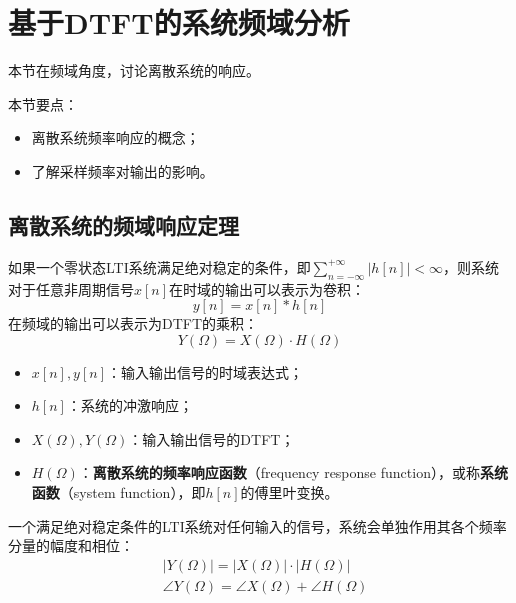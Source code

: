 \section{基于DTFT的系统频域分析}

本节在频域角度，讨论离散系统的响应。

本节要点：
\begin{itemize}
    \item 离散系统频率响应的概念；
    \item 了解采样频率对输出的影响。
\end{itemize}

\subsection{离散系统的频域响应定理}

\begin{theorem}[离散系统的频域响应定理]
如果一个零状态LTI系统满足绝对稳定的条件，即$\sum_{n=-\infty}^{+\infty}{\left| h\left[ n \right] \right|}<\infty $，则系统对于任意非周期信号$x\left[ n \right] $在时域的输出可以表示为卷积：
\[
y\left[ n \right] =x\left[ n \right] \ast h\left[ n \right]
\]
在频域的输出可以表示为DTFT的乘积：
\[
Y\left( \varOmega \right) =X\left( \varOmega \right) \cdot H\left( \varOmega \right)
\]
\begin{itemize}
    \item $x\left[ n \right] ,y\left[ n \right] $：输入输出信号的时域表达式；
    \item $h\left[ n \right] $：系统的冲激响应；
    \item $X\left( \varOmega \right) ,Y\left( \varOmega \right) $：输入输出信号的DTFT；
    \item $H\left( \varOmega \right) $：{\bf 离散系统的频率响应函数}（frequency response function），或称{\bf 系统函数}（system function），即$h\left[ n \right] $的傅里叶变换。
\end{itemize}
\end{theorem}

一个满足绝对稳定条件的LTI系统对任何输入的信号，系统会单独作用其各个频率分量的幅度和相位：
\begin{align*}
&\left| Y\left( \varOmega \right) \right|=\left| X\left( \varOmega \right) \right|\cdot \left| H\left( \varOmega \right) \right| \\
&\angle Y\left( \varOmega \right) =\angle X\left( \varOmega \right) +\angle H\left( \varOmega \right)
\end{align*}

